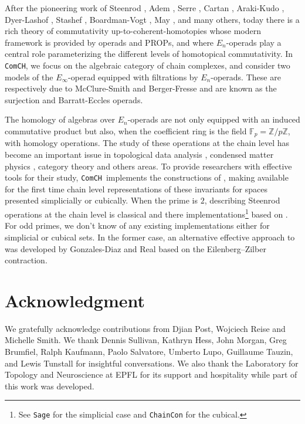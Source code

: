 \documentclass{amsart}
\newcommand{\comch}{\texttt{ComCH}}
\begin{document}
After the pioneering work of Steenrod \cite{Steenrod47, Steenrod62}, Adem \cite{Adem52}, Serre \cite{Serre53}, Cartan \cite{Cartan55}, Araki-Kudo \cite{ArakiKudo56}, Dyer-Lashof \cite{DyerLashof62}, Stashef \cite{Stasheff63}, Boardman-Vogt \cite{BoardmanVogt73}, May \cite{May70algebraic, May72geometry}, and many others, today there is a rich theory of commutativity up-to-coherent-homotopies whose modern framework is provided by operads and PROPs, and where $E_n$-operads play a central role parameterizing the different levels of homotopical commutativity. In \comch, we focus on the algebraic category of chain complexes, and consider two models of the $E_\infty$-operad equipped with filtrations by $E_n$-operads. These are respectively due to McClure-Smith \cite{McClureSmith03} and Berger-Fresse \cite{BergerFresse04} and are known as the surjection and Barratt-Eccles operads.

The homology of algebras over $E_n$-operads are not only equipped with an induced commutative product but also, when the coefficient ring is the field $\mathbb F_p = \mathbb Z/ p\mathbb Z$, with homology operations. The study of these operations at the chain level has become an important issue in topological data analysis \cite{medina2018persistence}, condensed matter physics \cite{Kapustin2017}, category theory \cite{medina2020globular} and others areas. To provide researchers with effective tools for their study, \comch\, implements the constructions of \cite{medina2020chain}, making available for the first time chain level representations of these invariants for spaces presented simplicially or cubically. When the prime is $2$, describing Steenrod operations at the chain level is classical and there implementations\footnote{See \texttt{Sage} for the simplicial case and \texttt{ChainCon} for the cubical.} based on \cite{GonReal1999, Pilarczyk2016}. For odd primes, we don't know of any existing implementations either for simplicial or cubical sets. In the former case, an alternative effective approach to \cite{medina2020chain} was developed by Gonzales-Diaz and Real \cite{GonReal2003, GonReal2005} based on the Eilenberg–Zilber contraction.

\tableofcontents

\section*{Acknowledgment}
We gratefully acknowledge contributions from Djian Post, Wojciech Reise and Michelle Smith. We thank Dennis Sullivan, Kathryn Hess, John Morgan, Greg Brumfiel, Ralph Kaufmann, Paolo Salvatore, Umberto Lupo, Guillaume Tauzin, and Lewis Tunstall for insightful conversations. We also thank the Laboratory for Topology and Neuroscience at EPFL for its support and hospitality while part of this work was developed.
\end{document}
